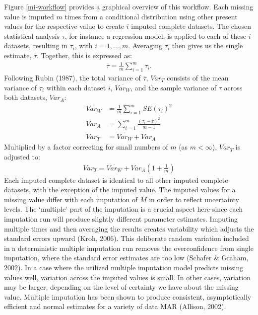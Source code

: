 \documentclass[12pt,econ]{sources/authesis}
\begin{document}
Figure \ref{mi-workflow} provides a graphical overview of this workflow. Each missing value is imputed \(m\) times from a conditional distribution using other present values for the respective value to create \(i\) imputed complete datasets. The chosen statistical analysis \(\tau\), for instance a regression model, is applied to each of these \(i\) datasets, resulting in \(\tau_{i}\), with \(i = 1, ..., m\). Averaging \(\tau_{i}\) then gives us the single estimate, \(\overline{\tau}\). Together, this is expressed as:
\begin{align}
\overline{\tau} = \frac{1}{m}\sum\limits_{i=1}^{m} \tau_{i}.
\end{align}
Following Rubin (1987), the total variance of \(\overline{\tau}\), \(Var_T\) consists of the mean variance of \(\tau_i\) within each dataset \(i\), \(\overline{Var_W}\), and the sample variance of \(\tau\) across both datasets, \(Var_A\):
\begin{align}
\overline{Var_W} &= \frac{1}{m} \sum\limits_{i=1}^{m} SE(\tau_i)^2\\
Var_A &= \sum\limits_{i=1}^{m} \frac{(\tau_{i} - \overline{\tau})^2}{m -1}\\
Var_T &= \overline{Var_W} + Var_A
\end{align}
Multiplied by a factor correcting for small numbers of \(m\) (as \(m < \infty\)), \(Var_T\) is adjusted to:
\begin{align}
Var_T = \overline{Var_W} + Var_A (1 + \frac{1}{m})
\end{align}
Each imputed complete dataset is identical to all other imputed complete datasets, with the exception of the imputed value. The imputed values for a missing value differ with each imputation of \(M\) in order to reflect uncertainty levels. The `multiple' part of the imputation is a crucial aspect here since each imputation run will produce slightly different parameter estimates. Imputing multiple times and then averaging the results creates variability which adjusts the standard errors upward (Kroh, 2006). This deliberate random variation included in a deterministic multiple imputation run removes the overconfidence from single imputation, where the standard error estimates are too low (Schafer \& Graham, 2002). In a case where the utilized multiple imputation model predicts missing values well, variation across the imputed values is small. In other cases, variation may be larger, depending on the level of certainty we have about the missing value. Multiple imputation has been shown to produce consistent, asymptotically efficient and normal estimates for a variety of data MAR (Allison, 2002).
\end{document}
